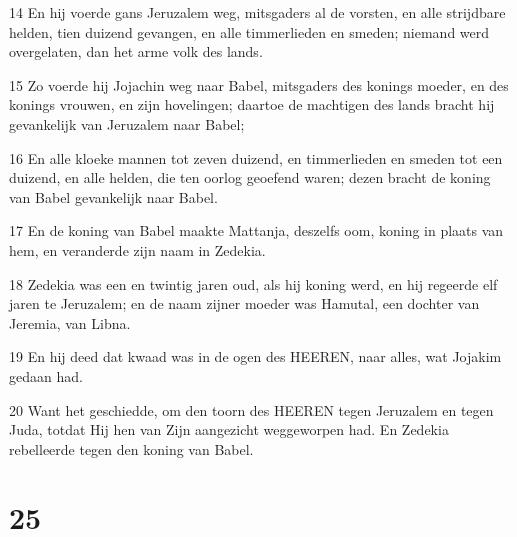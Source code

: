 \par 14 En hij voerde gans Jeruzalem weg, mitsgaders al de vorsten, en alle strijdbare helden, tien duizend gevangen, en alle timmerlieden en smeden; niemand werd overgelaten, dan het arme volk des lands.
\par 15 Zo voerde hij Jojachin weg naar Babel, mitsgaders des konings moeder, en des konings vrouwen, en zijn hovelingen; daartoe de machtigen des lands bracht hij gevankelijk van Jeruzalem naar Babel;
\par 16 En alle kloeke mannen tot zeven duizend, en timmerlieden en smeden tot een duizend, en alle helden, die ten oorlog geoefend waren; dezen bracht de koning van Babel gevankelijk naar Babel.
\par 17 En de koning van Babel maakte Mattanja, deszelfs oom, koning in plaats van hem, en veranderde zijn naam in Zedekia.
\par 18 Zedekia was een en twintig jaren oud, als hij koning werd, en hij regeerde elf jaren te Jeruzalem; en de naam zijner moeder was Hamutal, een dochter van Jeremia, van Libna.
\par 19 En hij deed dat kwaad was in de ogen des HEEREN, naar alles, wat Jojakim gedaan had.
\par 20 Want het geschiedde, om den toorn des HEEREN tegen Jeruzalem en tegen Juda, totdat Hij hen van Zijn aangezicht weggeworpen had. En Zedekia rebelleerde tegen den koning van Babel.

\chapter{25}


